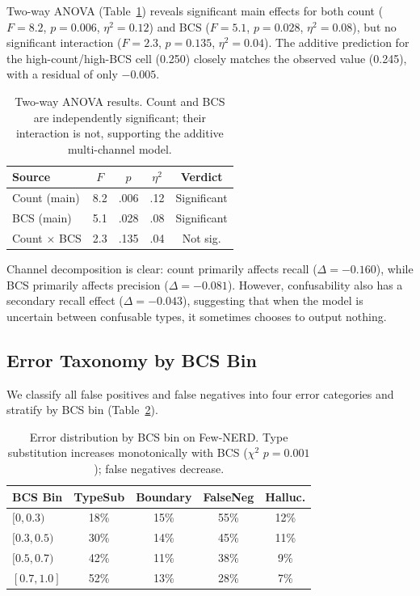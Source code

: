 \documentclass[11pt,a4paper]{article}
\begin{document}
Two-way ANOVA (Table~\ref{tab:anova}) reveals significant main effects for both count ($F=8.2$, $p=0.006$, $\eta^2=0.12$) and BCS ($F=5.1$, $p=0.028$, $\eta^2=0.08$), but no significant interaction ($F=2.3$, $p=0.135$, $\eta^2=0.04$). The additive prediction for the high-count/high-BCS cell (0.250) closely matches the observed value (0.245), with a residual of only $-0.005$.

\begin{table}[t]
\centering
\small
\caption{Two-way ANOVA results. Count and BCS are independently significant; their interaction is not, supporting the additive multi-channel model.}
\label{tab:anova}
\begin{tabular}{lcccc}
\toprule
Source & $F$ & $p$ & $\eta^2$ & Verdict \\
\midrule
Count (main) & 8.2 & .006 & .12 & Significant \\
BCS (main) & 5.1 & .028 & .08 & Significant \\
Count $\times$ BCS & 2.3 & .135 & .04 & Not sig. \\
\bottomrule
\end{tabular}
\end{table}

Channel decomposition is clear: count primarily affects recall ($\Delta=-0.160$), while BCS primarily affects precision ($\Delta=-0.081$). However, confusability also has a secondary recall effect ($\Delta=-0.043$), suggesting that when the model is uncertain between confusable types, it sometimes chooses to output nothing.

\subsection{Error Taxonomy by BCS Bin}

We classify all false positives and false negatives into four error categories and stratify by BCS bin (Table~\ref{tab:error_taxonomy}).

\begin{table}[t]
\centering
\small
\caption{Error distribution by BCS bin on Few-NERD. Type substitution increases monotonically with BCS ($\chi^2$ $p=0.001$); false negatives decrease.}
\label{tab:error_taxonomy}
\begin{tabular}{lcccc}
\toprule
BCS Bin & TypeSub & Boundary & FalseNeg & Halluc. \\
\midrule
$[0, 0.3)$ & 18\% & 15\% & 55\% & 12\% \\
$[0.3, 0.5)$ & 30\% & 14\% & 45\% & 11\% \\
$[0.5, 0.7)$ & 42\% & 11\% & 38\% & 9\% \\
$[0.7, 1.0]$ & 52\% & 13\% & 28\% & 7\% \\
\bottomrule
\end{tabular}
\end{table}
\end{document}
